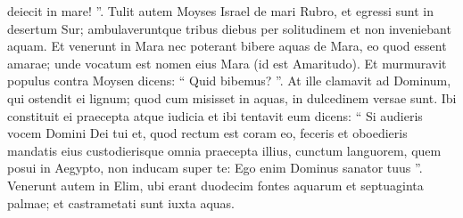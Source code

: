 \begin{biblechapter}
\begin{biblechapter}
\begin{biblechapter}
\begin{biblechapter}
\begin{biblechapter}
\begin{biblechapter}
\begin{biblechapter}
\begin{biblechapter}
\begin{biblechapter}
\begin{biblechapter}
\begin{biblechapter}
\begin{biblechapter}
\begin{biblechapter}
\begin{biblechapter}
\begin{biblechapter}
 deiecit in mare! ”.
 \verse Tulit autem Moyses Israel de mari Rubro, et egressi sunt in desertum Sur; ambulaveruntque tribus diebus per solitudinem et non inveniebant aquam. 
\verse Et venerunt in Mara nec poterant bibere aquas de Mara, eo quod essent amarae; unde vocatum est nomen eius Mara (id est Amaritudo). 
\verse Et murmuravit populus contra Moysen dicens: “ Quid bibemus? ”. 
\verse At ille clamavit ad Dominum, qui ostendit ei lignum; quod cum misisset in aquas, in dulcedinem versae sunt. Ibi constituit ei praecepta atque iudicia et ibi tentavit eum 
 \verse dicens: “ Si audieris vocem Domini Dei tui et, quod rectum est coram eo, feceris et oboedieris mandatis eius custodierisque omnia praecepta illius, cunctum languorem, quem posui in Aegypto, non inducam super te: Ego enim Dominus sanator tuus ”.
 \verse Venerunt autem in Elim, ubi erant duodecim fontes aquarum et septuaginta palmae; et castrametati sunt iuxta aquas.
 

\end{biblechapter}
\end{biblechapter}
\end{biblechapter}
\end{biblechapter}
\end{biblechapter}
\end{biblechapter}
\end{biblechapter}
\end{biblechapter}
\end{biblechapter}
\end{biblechapter}
\end{biblechapter}
\end{biblechapter}
\end{biblechapter}
\end{biblechapter}
\end{biblechapter}
